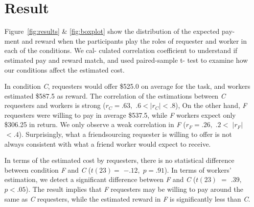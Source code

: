 \section{Result}

Figure~\ref{fig:results} \& \ref{fig:boxplot} show the distribution of the expected pay- ment and reward when 
the participants play the roles of requester and worker in each of the conditions. 
We cal- culated correlation coefficient to understand if estimated pay and reward match, 
and used paired-sample t- test to examine how our conditions affect the estimated cost.

In condition \emph{C}, requesters would offer \$525.0 on average for the task, 
and workers estimated \$587.5 as reward. 
The correlation of the estimations between \emph{C} requesters and workers is strong ($r_{C} = .63,$ $.6 < |r_{C}| < .8$),
On the other hand, \emph{F} requesters were willing to pay in average \$537.5, while \emph{F} workers expect only \$306.25 in return. 
We only observe a weak correlation in \emph{F} ($r_{F}=.26,$ $.2<$ $|r_{F}|$ $<.4$).  
Surprisingly, what a friendsourcing requester is willing to offer 
is not always consistent with what a friend worker would expect to receive.

In terms of the estimated cost by requesters, 
there is no statistical difference between condition \emph{F} and \emph{C} ($t(23)=$ $-.12,$ $p=.91$).
In terms of workers' estimation, 
we detect a significant difference between \emph{F} and \emph{C} ($t(23)$ $=$ $.39,$ $p<.05$).
The result implies that \emph{F} requesters may be willing to pay around the same as \emph{C} requesters,
while the estimated reward in \emph{F} is significantly less than \emph{C}.

